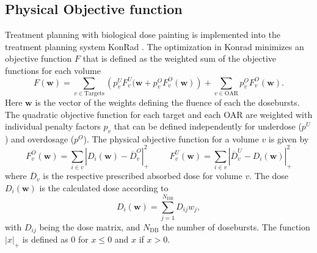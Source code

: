 \subsection{Physical Objective function}\label{chap:objectivefunctions}
Treatment planning with biological dose painting is implemented into the treatment planning system KonRad \cite{nill}. The optimization in Konrad minimizes an objective function $F$ that is defined as the weighted sum of the objective functions for each volume
\begin{equation}
F(\mathbf{w}) = \sum\limits_{v\in\mathrm{Targets}}\left(p_v^UF_v^U(\mathbf{w}+p_v^OF_v^O(\mathbf{w})\right) + \sum\limits_{v\in\mathrm{OAR}}p_v^OF_v^O(\mathbf{w}).
\end{equation}
Here $\mathbf{w}$ is the vector of the weights defining the fluence of each the dosebursts. The quadratic objective function for each target and each OAR are weighted with individual penalty factors $p_v$ that can be defined independently for underdose ($p^U$) and overdosage ($p^O$). The physical objective function for a volume $v$ is given by \cite{pmid11444513}
\begin{equation}
F_v^O (\mathbf{w}) = \sum\limits_{i\in v} \left|D_i(\mathbf{w})-\overline{D}_v^O\right|_+^2\hspace{1cm}F_v^U (\mathbf{w}) = \sum\limits_{i\in v} \left|\overline{D}_v^U-D_i(\mathbf{w})\right|_+^2
\end{equation}
where $\overline{D}_v$ is the respective prescribed absorbed dose for volume $v$. The dose $D_i(\mathbf{w})$ is the calculated dose according to
\begin{equation}
D_i(\mathbf{w}) = \sum\limits_{j=1}^{N_{\mathrm{DB}}} D_{ij}w_j,
\end{equation}
with $D_{ij}$ being the dose matrix, and $N_{\mathrm{DB}}$ the number of dosebursts. The function $|x|_+$ is defined as 0 for $x\leq0$ and $x$ if $x>0$.
